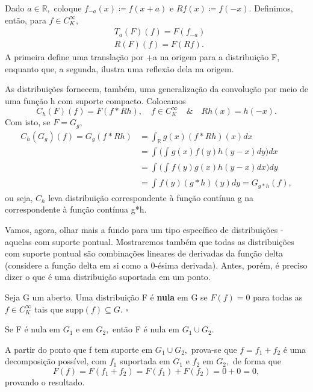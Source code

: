 \documentclass[measure_theory.tex]{subfiles}
\begin{document}
\begin{example}
	Dado \(a\in \mathbb{R},\) coloque \(f_{-a}(x)\coloneqq f(x+a)\) e \(Rf(x)\coloneqq f(-x)\). Definimos, então, para \(f\in C_{K}^{\infty},\)
	\begin{align*}
		 & T_{a}(F)(f) = F(f_{-a}) \\
		 & R(F)(f) = F(Rf).
	\end{align*}
	A primeira define uma translação por +a na origem para a distribuição F, enquanto que, a segunda, ilustra uma reflexão dela na origem.
\end{example}
\begin{example}
	As distribuições fornecem, também, uma generalização da convolução por meio de uma função h com suporte compacto. Colocamos
	\[
		C_{h}(F)(f) = F(f*Rh),\quad f\in C_{K}^{\infty}\quad\&\quad Rh(x) = h(-x).
	\]
	Com isto, se \(F = G_{g},\)
	\begin{align*}
		C_{h}(G_{g})(f) = G_{g}(f*Rh) & =\int_{\mathbb{R}}^{}g(x)(f*Rh)(x)dx                   \\
		                              & = \int_{}^{}\biggl(\int_{}^{}g(x)f(y)h(y-x)dy\biggr)dx \\
		                              & = \int_{}^{}\biggl(\int_{}^{}f(y)g(x)h(y-x)dx\biggr)dy \\
		                              & = \int_{}^{}f(y)(g*h)(y)dy = G_{g*h}(f),
	\end{align*}
	ou seja, \(C_{h}\) leva distribuição correspondente à função contínua g na correspondente à função contínua g*h.
\end{example}
Vamos, agora, olhar mais a fundo para um tipo específico de distribuições - aquelas com suporte pontual. Mostraremos também que todas as distribuições com suporte pontual são combinações lineares
de derivadas da função delta (considere a função delta em si como a 0-ésima derivada). Antes, porém, é preciso dizer o que é uma distribuição suportada em um ponto.
\begin{def*}
	Seja G um aberto. Uma distribuição F é \textbf{nula} em G se \(F(f) = 0\) para todas as \(f\in C_{K}^{\infty}\) tais que \(\mathrm{supp}(f)\subseteq G\). \(\square\)
\end{def*}
\begin{lemma*}
	Se F é nula em \(G_{1}\) e em \(G_{2},\) então F é nula em \(G_1\cup G_2\).
\end{lemma*}
\begin{proof*}
	A partir do ponto que f tem suporte em \(G_{1}\cup G_{2},\) prova-se que \(f = f_{1} + f_{2}\) é uma decomposição possível, com \(f_{1}\) suportada em \(G_{1}\) e \(f_{2}\) em \(G_{2},\) de forma que
	\[
		F(f) = F(f_{1} + f_{2}) = F(f_{1}) + F(f_{2}) = 0 + 0 = 0,
	\]
	provando o resultado. \qedsymbol
\end{proof*}
\end{document}
